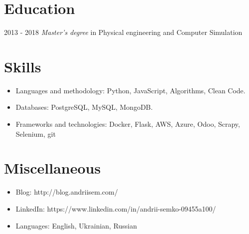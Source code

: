 \documentclass{resume}
\begin{document}
\section{Education}
 {2013 - 2018}
\textit{Master's degree} in Physical engineering and Computer Simulation



\section{Skills}
\begin{itemize}[parsep=0.5ex]
    \item Languages and methodology: Python, JavaScript, Algorithms, Clean Code.
    \item Databases: PostgreSQL, MySQL, MongoDB.
    \item Frameworks and technologies: Docker, Flask, AWS, Azure, Odoo, Scrapy, Selenium, git
\end{itemize}

\section{Miscellaneous}
\begin{itemize}[parsep=0.5ex]
  \item Blog: http://blog.andriisem.com/
  \item LinkedIn: https://www.linkedin.com/in/andrii-semko-09455a100/
  \item Languages: English, Ukrainian, Russian
\end{itemize}
\end{document}
